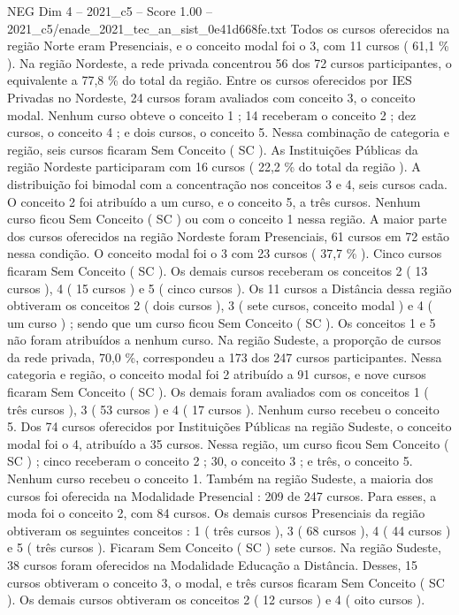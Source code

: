 \begin{textsample}{NEG Dim 4 – 2021\_c5 – Score 1.00 – 2021\_c5/enade\_2021\_tec\_an\_sist\_0e41d668fe.txt}
Todos os cursos oferecidos na região Norte eram Presenciais, e o conceito modal foi o 3, com 11 cursos ( 61,1 \% ).
Na região Nordeste, a rede privada concentrou 56 dos 72 cursos participantes, o equivalente a 77,8 \% do total da região.
Entre os cursos oferecidos por IES Privadas no Nordeste, 24 cursos foram avaliados com conceito 3, o conceito modal.
Nenhum curso obteve o conceito 1 ; 14 receberam o conceito 2 ; dez cursos, o conceito 4 ; e dois cursos, o conceito 5.
Nessa combinação de categoria e região, seis cursos ficaram Sem Conceito ( SC ).
As Instituições Públicas da região Nordeste participaram com 16 cursos ( 22,2 \% do total da região ).
A distribuição foi bimodal com a concentração nos conceitos 3 e 4, seis cursos cada.
O conceito 2 foi atribuído a um curso, e o conceito 5, a três cursos.
Nenhum curso ficou Sem Conceito ( SC ) ou com o conceito 1 nessa região.
A maior parte dos cursos oferecidos na região Nordeste foram Presenciais, 61 cursos em 72 estão nessa condição.
O conceito modal foi o 3 com 23 cursos ( 37,7 \% ).
Cinco cursos ficaram Sem Conceito ( SC ).
Os demais cursos receberam os conceitos 2 ( 13 cursos ), 4 ( 15 cursos ) e 5 ( cinco cursos ).
Os 11 cursos a Distância dessa região obtiveram os conceitos 2 ( dois cursos ), 3 ( sete cursos, conceito modal ) e 4 ( um curso ) ; sendo que um curso ficou Sem Conceito ( SC ).
Os conceitos 1 e 5 não foram atribuídos a nenhum curso.
Na região Sudeste, a proporção de cursos da rede privada, 70,0 \%, correspondeu a 173 dos 247 cursos participantes.
Nessa categoria e região, o conceito modal foi 2 atribuído a 91 cursos, e nove cursos ficaram Sem Conceito ( SC ).
Os demais foram avaliados com os conceitos 1 ( três cursos ), 3 ( 53 cursos ) e 4 ( 17 cursos ).
Nenhum curso recebeu o conceito 5.
Dos 74 cursos oferecidos por Instituições Públicas na região Sudeste, o conceito modal foi o 4, atribuído a 35 cursos.
Nessa região, um curso ficou Sem Conceito ( SC ) ; cinco receberam o conceito 2 ; 30, o conceito 3 ; e três, o conceito 5.
Nenhum curso recebeu o conceito 1.
Também na região Sudeste, a maioria dos cursos foi oferecida na Modalidade Presencial : 209 de 247 cursos.
Para esses, a moda foi o conceito 2, com 84 cursos.
Os demais cursos Presenciais da região obtiveram os seguintes conceitos : 1 ( três cursos ), 3 ( 68 cursos ), 4 ( 44 cursos ) e 5 ( três cursos ).
Ficaram Sem Conceito ( SC ) sete cursos.
Na região Sudeste, 38 cursos foram oferecidos na Modalidade Educação a Distância.
Desses, 15 cursos obtiveram o conceito 3, o modal, e três cursos ficaram Sem Conceito ( SC ).
Os demais cursos obtiveram os conceitos 2 ( 12 cursos ) e 4 ( oito cursos ).

\end{textsample}
